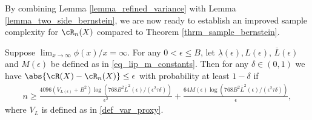 \documentclass[9pt]{article} %
\numberwithin{equation}{section}
\renewcommand{\frac}[2]{\tfrac{#1}{#2}}
\begin{document}
By  combining Lemma \ref{lemma_refined_variance} with Lemma \ref{lemma_two_side_bernstein},  we are now ready to establish an improved sample complexity for $\cR_n(X)$  compared to Theorem \ref{thrm_sample_bernstein}.


\begin{theorem}\label{thrm_sample_complexity_improved_var}
Suppose $\lim_{x \to \infty} \phi(x) / x = \infty$. 
For any $0 < \epsilon \leq B $, let 
$\underline{\lambda}(\epsilon), L(\epsilon)$, 
 $\overline{L}(\epsilon)$ and $M(\epsilon)$ be defined as in \eqref{eq_lip_m_constants}.
Then 
for any $\delta \in (0,1)$  
we have $\abs{\cR(X) - \cR_n(X)} \leq \epsilon$ with probability at least $1-\delta$
 if 
\begin{align*}
n \geq 
\frac{4096 (V_{L(\epsilon)} + B^2) \log (768 B^2 \overline{L}^2(\epsilon)/ (\epsilon^2 \tau \delta))}{\epsilon^2} 
+ 
\frac{64 M(\epsilon)  \log (768 B^2 \overline{L}^2(\epsilon)/ (\epsilon^2 \tau \delta))}{\epsilon} ,
\end{align*}
where $V_L$ is defined as in \eqref{def_var_proxy}.
\end{theorem}
\end{document}
